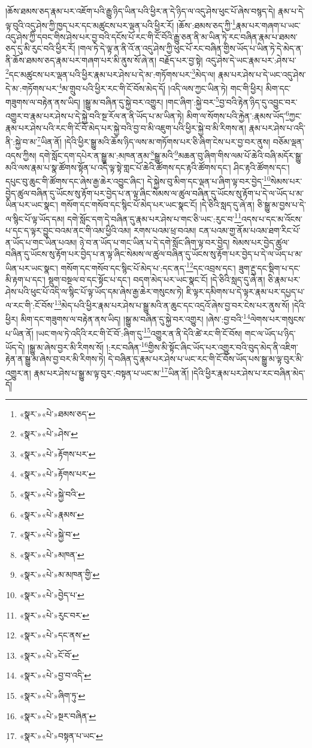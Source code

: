 །ཆོས་ཐམས་ཅད་རྣམ་པར་འཇོག་པའི་རྒྱུ་ཉིད་ཡིན་པའི་ཕྱིར་ན་དེ་ཉིད་ལ་འདུ་ཤེས་ཕུང་པོ་ཞེས་བསྙད་དེ། རྣམ་པ་དེ་ལྟ་བུའི་འདུ་ཤེས་ཀྱི་ཁྱད་པར་དང་མཚུངས་པར་ལྡན་པའི་ཕྱིར་རོ། །ཆོས་:ཐམས་ཅད་ཀྱི་\footnote{«སྣར་»«པེ་»ཐམས་ཅད་}རྣམ་པར་གཞག་པ་ཡང་འདུ་ཤེས་ཀྱི་དབང་གིས་ཤེས་པར་བྱ་བའི་དངོས་པོ་རང་གི་ངོ་བོའི་རྒྱུ་ཅན་ནི་མ་ཡིན་ཏེ་རང་བཞིན་རྣམ་པ་ཐམས་ཅད་དུ་མི་རུང་བའི་ཕྱིར་རོ། །གལ་ཏེ་དེ་ལྟ་ན་ནི་འོ་ན་འདུ་ཤེས་ཀྱི་ཕུང་པོ་རང་བཞིན་གྱིས་ཡོད་པ་ཡིན་ཏེ་དེ་མེད་ན་ནི་ཆོས་ཐམས་ཅད་རྣམ་པར་གཞག་པར་མི་ནུས་སོ་ཞེ་ན། བརྗོད་པར་བྱ་སྟེ། འདུ་ཤེས་དེ་ཡང་རྣམ་པར་:ཤེས་པ་\footnote{«སྣར་»«པེ་»ཤེས་}དང་མཚུངས་པར་ལྡན་པའི་ཕྱིར་རྣམ་པར་ཤེས་པ་དེ་མ་:གཏོགས་པར་\footnote{«སྣར་»«པེ་»རྟོགས་པར་}མེད་ལ། རྣམ་པར་ཤེས་པ་དེ་ཡང་འདུ་ཤེས་དེ་མ་:གཏོགས་པར་\footnote{«སྣར་»«པེ་»རྟོགས་པར་}མ་གྲུབ་པའི་ཕྱིར་རང་གི་ངོ་བོས་མེད་དོ། །འདི་ལས་ཀྱང་ཡིན་ཏེ། གང་གི་ཕྱིར། མིག་དང་གཟུགས་ལ་བརྟེན་ནས་ཡིད། །སྒྱུ་མ་བཞིན་དུ་སྐྱེ་བར་འགྱུར། །གང་ཞིག་:སྐྱེ་བར་\footnote{«སྣར་»«པེ་»སྐྱེ་བའི་}བྱ་བའི་རྟེན་ཉིད་དུ་འབྱུང་བར་འགྱུར་བ་རྣམ་པར་ཤེས་པ་དེ་སྐྱེ་བའི་སྔ་རོལ་ན་ནི་ཡོད་པ་མ་ཡིན་ཏེ། མིག་ལ་སོགས་པའི་རྐྱེན་:རྣམས་ཡོད་\footnote{«སྣར་»«པེ་»རྣམས་}ཀྱང་རྣམ་པར་ཤེས་པའི་རང་གི་ངོ་བོ་མེད་པར་སྐྱེ་བའི་བྱ་བ་མི་འཇུག་པའི་ཕྱིར་སྐྱེ་བ་མི་རིགས་ན། རྣམ་པར་ཤེས་པ་འདི་ནི་:སྐྱེ་བ་མ་\footnote{«སྣར་»«པེ་»སྐྱེ་བ་}ཡིན་ནོ། །དེའི་ཕྱིར་སྒྱུ་མའི་ཆོས་ཉིད་ལས་མ་གཏོགས་པར་ཅི་ཞིག་ངེས་པར་བྱ་བར་ནུས། བཅོམ་ལྡན་འདས་ཀྱིས། དགེ་སློང་དག་དཔེར་ན་སྒྱུ་མ་:མཁན་ནམ་\footnote{«སྣར་»«པེ་»མཁན་}སྒྱུ་མའི་\footnote{«སྣར་»«པེ་»མ་མཁན་གྱི་}མཆན་བུ་ཞིག་གིས་ལམ་པོ་ཆེའི་བཞི་མདོར་སྒྱུ་མའི་ལས་རྣམ་པ་སྣ་ཚོགས་སྟོན་པ་འདི་ལྟ་སྟེ་གླང་པོ་ཆེའི་ཚོགས་དང་རྟའི་ཚོགས་དང་། ཤིང་རྟའི་ཚོགས་དང་། དཔུང་བུ་ཆུང་གི་ཚོགས་དང་ཞེས་རྒྱ་ཆེར་འབྱུང་ཞིང་། དེ་སྐྱེས་བུ་མིག་དང་ལྡན་པ་ཞིག་ལྟ་བར་བྱེད་\footnote{«སྣར་»«པེ་»བྱེད་པ་}སེམས་པར་བྱེད་ཚུལ་བཞིན་དུ་ཡོངས་སུ་རྟོག་པར་བྱེད་པ་ན་ལྟ་ཞིང་སེམས་ལ་ཚུལ་བཞིན་དུ་ཡོངས་སུ་རྟོག་པ་དེ་ལ་ཡོད་པ་མ་ཡིན་པར་ཡང་སྣང་། གསོག་དང་གསོབ་དང་སྙིང་པོ་མེད་པར་ཡང་སྣང་ངོ། །དེ་ཅིའི་སླད་དུ་ཞེ་ན། ཅི་སྒྱུ་མ་བྱས་པ་དེ་ལ་སྙིང་པོ་ལྟ་ཡོད་དམ། དགེ་སློང་དག་དེ་བཞིན་དུ་རྣམ་པར་ཤེས་པ་གང་ཅི་ཡང་:རུང་བ་\footnote{«སྣར་»«པེ་»རུང་བར་}འདས་པ་དང་མ་འོངས་པ་དང་ད་ལྟར་བྱུང་བའམ་ནང་གི་འམ་ཕྱིའི་འམ། རགས་པའམ་ཕྲ་བའམ། ངན་པའམ་གྱ་ནོམ་པའམ་ཐག་རིང་པོ་ན་ཡོད་པ་གང་ཡིན་པའམ། ཉེ་བ་ན་ཡོད་པ་གང་ཡིན་པ་དེ་དགེ་སློང་ཞིག་ལྟ་བར་བྱེད། སེམས་པར་བྱེད་ཚུལ་བཞིན་དུ་ཡོངས་སུ་རྟོག་པར་བྱེད་པ་ན་ལྟ་ཞིང་སེམས་ལ་ཚུལ་བཞིན་དུ་ཡོངས་སུ་རྟོག་པར་བྱེད་པ་དེ་ལ་ཡོད་པ་མ་ཡིན་པར་ཡང་སྣང་། གསོག་དང་གསོབ་དང་སྙིང་པོ་མེད་པ་:དང་ནད་\footnote{«སྣར་»«པེ་»དང་ནས་}དང་འབྲས་དང་། ཟུག་རྔུ་དང་སྡིག་པ་དང་མི་རྟག་པ་དང་། སྡུག་བསྔལ་བ་དང་སྟོང་པ་དང་། བདག་མེད་པར་ཡང་སྣང་ངོ། །དེ་ཅིའི་སླད་དུ་ཞེ་ན། ཅི་རྣམ་པར་ཤེས་པའི་ཕུང་པོ་འདི་ལ་སྙིང་པོ་ལྟ་ཡོད་དམ་ཞེས་རྒྱ་ཆེར་གསུངས་ཏེ། ཇི་ལྟར་དམིགས་པ་དེ་ལྟར་རྣམ་པར་དཔྱད་པ་ལ་རང་གི་:ངོ་བོས་\footnote{«སྣར་»«པེ་»ངོ་བོ་}མེད་པའི་ཕྱིར་རྣམ་པར་ཤེས་པ་སྒྱུ་མའི་ན་ཆུང་དང་འདྲའོ་ཞེས་བྱ་བར་ངེས་པར་ནུས་སོ། །དེའི་ཕྱིར། མིག་དང་གཟུགས་ལ་བརྟེན་ནས་ཡིད། །སྒྱུ་མ་བཞིན་དུ་སྐྱེ་བར་འགྱུར། །ཞེས་:བྱ་བའི་\footnote{«སྣར་»«པེ་»བྱ་བ་འདི་}ལེགས་པར་གསུངས་པ་ཡིན་ནོ། །ཡང་གལ་ཏེ་འདིའི་རང་གི་ངོ་བོ་:ཞིག་དུ་\footnote{«སྣར་»«པེ་»ཞིག་ཏུ་}འགྱུར་ན་ནི་དེའི་ཚེ་རང་གི་ངོ་བོས། གང་ལ་ཡོད་པ་ཉིད་ཡོད་དེ། །སྒྱུ་མ་ཞེས་བྱར་མི་རིགས་སོ། །:རང་བཞིན་\footnote{«སྣར་»«པེ་»སྔར་བཞིན་}གྱིས་མི་སྟོང་ཞིང་ཡོད་པར་འགྱུར་བའི་བུད་མེད་ནི་འཇིག་རྟེན་ན་སྒྱུ་མ་ཞེས་བྱ་བར་མི་རིགས་ཏེ། དེ་བཞིན་དུ་རྣམ་པར་ཤེས་པ་ཡང་རང་གི་ངོ་བོས་ཡོད་པས་སྒྱུ་མ་ལྟ་བུར་མི་འགྱུར་ན། རྣམ་པར་ཤེས་པ་སྒྱུ་མ་ལྟ་བུར་:བསྟན་པ་ཡང་མ་\footnote{«སྣར་»«པེ་»བསྟན་པ་ཡང་}ཡིན་ནོ། །དེའི་ཕྱིར་རྣམ་པར་ཤེས་པ་རང་བཞིན་མེད་དོ། 